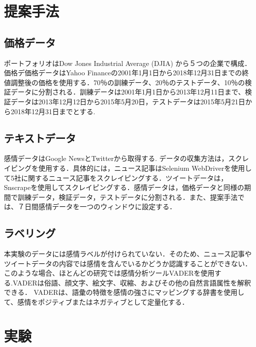 \documentclass[submit,techrep,noauthor]{ipsj}
\begin{document}
\section{提案手法}
\subsection{価格データ}
ポートフォリオはDow Jones Industrial Average (DJIA) から５つの企業で構成．価格デ価格データはYahoo Financeの2001年1月1日から2018年12月31日までの終値調整後の価格を使用する．70％の訓練データ、20％のテストデータ、10％の検証データに分割される．訓練データは2001年1月1日から2013年12月11日まで、検証データは2013年12月12日から2015年5月20日，テストデータは2015年5月21日から2018年12月31日までとする.
\subsection{テキストデータ}
感情データはGoogle NewsとTwitterから取得する. データの収集方法は，スクレイピングを使用する．具体的には，ニュース記事はSelenium WebDriverを使用して5社に関するニュース記事をスクレイピングする．ツイートデータは，Snscrapeを使用してスクレイピングする．感情データは，価格データと同様の期間で訓練データ，検証データ，テストデータに分割される．また、提案手法では、７日間感情データを一つのウィンドウに設定する．
\subsection{ラベリング}
本実験のデータには感情ラベルが付けられていない．そのため、ニュース記事やツイートデータの内容では感情を含んでいるかどうか認識することができない．このような場合、ほとんどの研究では感情分析ツールVADERを使用する.VADERは俗語、顔文字、絵文字、収縮、およびその他の自然言語属性を解釈できる． VADERは、語彙の特徴を感情の強さにマッピングする辞書を使用して、感情をポジティブまたはネガティブとして定量化する． 

\section{実験}
\end{document}
